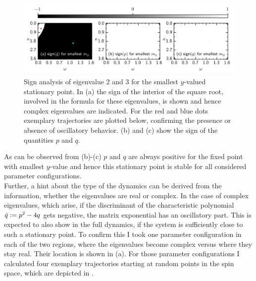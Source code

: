 \begin{figure}[H]
    \includegraphics{pictures/lam2_anal_s2.png}
    \caption{Sign analysis of eigenvalue 2 and 3 for the smallest $y$-valued stationary point. In (a) the sign of the interior of the square root, involved in the formula for these eigenvalues, is shown and hence complex eigenvalues are indicated. For the red and blue dots exemplary trajectories are plotted below, confirming the presence or absence of oscillatory behavior. (b) and (c) show the sign of the quantities $p$ and $q$.}%
    \label{fig:sign_lam23_s}
\end{figure}%
As can be observed from  (b)-(c) $p$ and $q$ are always positive for the fixed point with smallest $y$-value and hence this stationary point is stable for all considered parameter configurations.\\
Further, a hint about the type of the dynamics can be derived from the information, whether the eigenvalues are real or complex. In the case of complex eigenvalues, which arise, if the discriminant of the characteristic polynomial $\bar{q}\vcentcolon=p^2-4q$ gets negative,  the matrix exponential has an oscillatory part. This is expected to also show in the full dynamics, if the system is sufficiently close to such a stationary point. To confirm this I took one parameter configuration in each of the two regions, where the eigenvalues become complex versus where they stay real. Their location is shown in  (a). For those parameter configurations I calculated four exemplary trajectories starting at random points in the spin space, which are depicted in .
